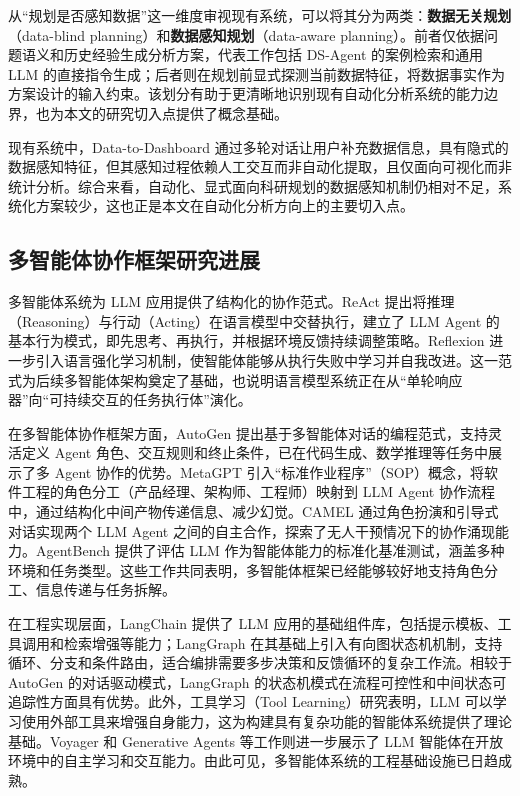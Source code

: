 从“规划是否感知数据”这一维度审视现有系统，可以将其分为两类：\textbf{数据无关规划}（data-blind planning）和\textbf{数据感知规划}（data-aware planning）。前者仅依据问题语义和历史经验生成分析方案，代表工作包括 DS-Agent 的案例检索和通用 LLM 的直接指令生成；后者则在规划前显式探测当前数据特征，将数据事实作为方案设计的输入约束。该划分有助于更清晰地识别现有自动化分析系统的能力边界，也为本文的研究切入点提供了概念基础。

现有系统中，Data-to-Dashboard\cite{zhang2025data} 通过多轮对话让用户补充数据信息，具有隐式的数据感知特征，但其感知过程依赖人工交互而非自动化提取，且仅面向可视化而非统计分析。综合来看，自动化、显式面向科研规划的数据感知机制仍相对不足，系统化方案较少，这也正是本文在自动化分析方向上的主要切入点。

\subsection{多智能体协作框架研究进展}

多智能体系统为 LLM 应用提供了结构化的协作范式。ReAct\cite{yao2023react} 提出将推理（Reasoning）与行动（Acting）在语言模型中交替执行，建立了 LLM Agent 的基本行为模式，即先思考、再执行，并根据环境反馈持续调整策略。Reflexion\cite{shinn2024reflexion} 进一步引入语言强化学习机制，使智能体能够从执行失败中学习并自我改进。这一范式为后续多智能体架构奠定了基础，也说明语言模型系统正在从“单轮响应器”向“可持续交互的任务执行体”演化。

在多智能体协作框架方面，AutoGen\cite{wu2023autogen} 提出基于多智能体对话的编程范式，支持灵活定义 Agent 角色、交互规则和终止条件，已在代码生成、数学推理等任务中展示了多 Agent 协作的优势。MetaGPT\cite{hong2024metagpt} 引入“标准作业程序”（SOP）概念，将软件工程的角色分工（产品经理、架构师、工程师）映射到 LLM Agent 协作流程中，通过结构化中间产物传递信息、减少幻觉。CAMEL\cite{li2023camel} 通过角色扮演和引导式对话实现两个 LLM Agent 之间的自主合作，探索了无人干预情况下的协作涌现能力。AgentBench\cite{liu2023agentbench} 提供了评估 LLM 作为智能体能力的标准化基准测试，涵盖多种环境和任务类型。这些工作共同表明，多智能体框架已经能够较好地支持角色分工、信息传递与任务拆解。

在工程实现层面，LangChain\cite{chase2022langchain} 提供了 LLM 应用的基础组件库，包括提示模板、工具调用和检索增强等能力；LangGraph\cite{langgraph2024} 在其基础上引入有向图状态机机制，支持循环、分支和条件路由，适合编排需要多步决策和反馈循环的复杂工作流。相较于 AutoGen 的对话驱动模式，LangGraph 的状态机模式在流程可控性和中间状态可追踪性方面具有优势\cite{wang2024survey,xi2023rise}。此外，工具学习（Tool Learning）研究表明，LLM 可以学习使用外部工具来增强自身能力\cite{schick2024toolformer,qin2023tool,mialon2023augmented}，这为构建具有复杂功能的智能体系统提供了理论基础。Voyager\cite{wang2023voyager} 和 Generative Agents\cite{park2023generative} 等工作则进一步展示了 LLM 智能体在开放环境中的自主学习和交互能力。由此可见，多智能体系统的工程基础设施已日趋成熟。


